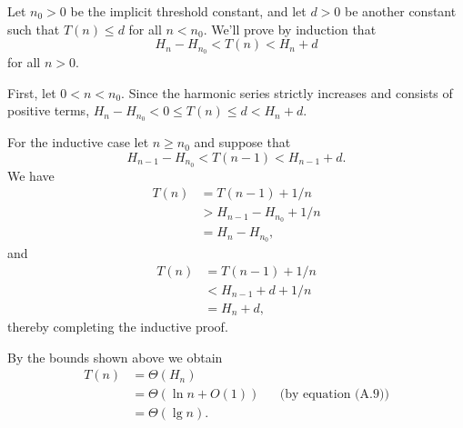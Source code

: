 Let $n_0>0$ be the implicit threshold constant, and let $d>0$ be another constant such that $T(n)\le d$ for all $n<n_0$.
We'll prove by induction that
\[
    H_n-H_{n_0} < T(n) < H_n+d
\]
for all $n>0$.

First, let $0<n<n_0$.
Since the harmonic series strictly increases and consists of positive terms, $H_n-H_{n_0}<0\le T(n)\le d<H_n+d$.

For the inductive case let $n\ge n_0$ and suppose that
\[
    H_{n-1}-H_{n_0} < T(n-1) < H_{n-1}+d.
\]
We have
\begin{align*}
    T(n) &= T(n-1)+1/n \\
    &> H_{n-1}-H_{n_0}+1/n \\
    &= H_n-H_{n_0},
\end{align*}
and
\begin{align*}
    T(n) &= T(n-1)+1/n \\
    &< H_{n-1}+d+1/n \\
    &= H_n+d,
\end{align*}
thereby completing the inductive proof.

By the bounds shown above we obtain
\begin{align*}
    T(n) &= \Theta(H_n) \\
    &= \Theta(\ln n+O(1)) && \text{(by equation (A.9))} \\
    &= \Theta(\lg n).
\end{align*}
